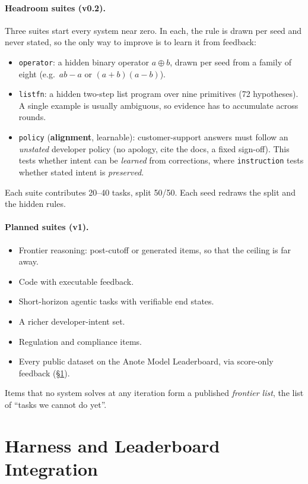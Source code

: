 \documentclass[11pt]{article}
\begin{document}
\paragraph{Headroom suites (v0.2).} Three suites start every system near zero. In each, the rule is drawn per seed and never stated, so the only way to improve is to learn it from feedback:
\begin{itemize}
  \item \texttt{operator}: a hidden binary operator $a \oplus b$, drawn per seed from a family of eight (e.g.\ $a b - a$ or $(a{+}b)(a{-}b)$).
  \item \texttt{listfn}: a hidden two-step list program over nine primitives (72 hypotheses). A single example is usually ambiguous, so evidence has to accumulate across rounds.
  \item \texttt{policy} (\textbf{alignment}, learnable): customer-support answers must follow an \emph{unstated} developer policy (no apology, cite the docs, a fixed sign-off). This tests whether intent can be \emph{learned} from corrections, where \texttt{instruction} tests whether stated intent is \emph{preserved}.
\end{itemize}
Each suite contributes 20--40 tasks, split 50/50. Each seed redraws the split and the hidden rules.

\paragraph{Planned suites (v1).}
\begin{itemize}
  \item Frontier reasoning: post-cutoff or generated items, so that the ceiling is far away.
  \item Code with executable feedback.
  \item Short-horizon agentic tasks with verifiable end states.
  \item A richer developer-intent set.
  \item Regulation and compliance items.
  \item Every public dataset on the Anote Model Leaderboard, via score-only feedback (\S\ref{sec:harness}).
\end{itemize}
Items that no system solves at any iteration form a published \emph{frontier list}, the list of ``tasks we cannot do yet''.

\section{Harness and Leaderboard Integration}
\label{sec:harness}
\end{document}
